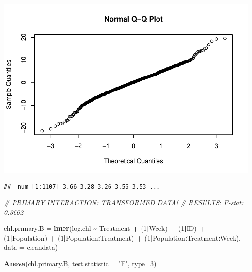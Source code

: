 \documentclass[
]{article}
\newenvironment{Shaded}{\begin{snugshade}}{\end{snugshade}}
\newcommand{\AttributeTok}[1]{\textcolor[rgb]{0.13,0.29,0.53}{#1}}
\newcommand{\CommentTok}[1]{\textcolor[rgb]{0.56,0.35,0.01}{\textit{#1}}}
\newcommand{\DecValTok}[1]{\textcolor[rgb]{0.00,0.00,0.81}{#1}}
\newcommand{\FunctionTok}[1]{\textcolor[rgb]{0.13,0.29,0.53}{\textbf{#1}}}
\newcommand{\NormalTok}[1]{#1}
\newcommand{\OtherTok}[1]{\textcolor[rgb]{0.56,0.35,0.01}{#1}}
\newcommand{\SpecialCharTok}[1]{\textcolor[rgb]{0.81,0.36,0.00}{\textbf{#1}}}
\newcommand{\StringTok}[1]{\textcolor[rgb]{0.31,0.60,0.02}{#1}}
\begin{document}
\includegraphics{../Output/unnamed-chunk-6-1.pdf}

\begin{Shaded}
\end{Shaded}

\begin{verbatim}
##  num [1:1107] 3.66 3.28 3.26 3.56 3.53 ...
\end{verbatim}

\begin{Shaded}
\begin{Highlighting}[]
\CommentTok{\# PRIMARY INTERACTION: TRANSFORMED DATA!}
\CommentTok{\# RESULTS: F{-}stat: 0.3662}

\NormalTok{chl.primary.B }\OtherTok{=} \FunctionTok{lmer}\NormalTok{(log.chl }\SpecialCharTok{\textasciitilde{}}\NormalTok{ Treatment }\SpecialCharTok{+}\NormalTok{ (}\DecValTok{1}\SpecialCharTok{|}\NormalTok{Week) }\SpecialCharTok{+}\NormalTok{ (}\DecValTok{1}\SpecialCharTok{|}\NormalTok{ID) }\SpecialCharTok{+}\NormalTok{ (}\DecValTok{1}\SpecialCharTok{|}\NormalTok{Population) }\SpecialCharTok{+}\NormalTok{ (}\DecValTok{1}\SpecialCharTok{|}\NormalTok{Population}\SpecialCharTok{:}\NormalTok{Treatment) }\SpecialCharTok{+}\NormalTok{ (}\DecValTok{1}\SpecialCharTok{|}\NormalTok{Population}\SpecialCharTok{:}\NormalTok{Treatment}\SpecialCharTok{:}\NormalTok{Week), }\AttributeTok{data =}\NormalTok{ cleandata)}

\FunctionTok{Anova}\NormalTok{(chl.primary.B, }\AttributeTok{test.statistic =} \StringTok{"F"}\NormalTok{, }\AttributeTok{type=}\DecValTok{3}\NormalTok{) }
\end{Highlighting}
\end{Shaded}
\end{document}
